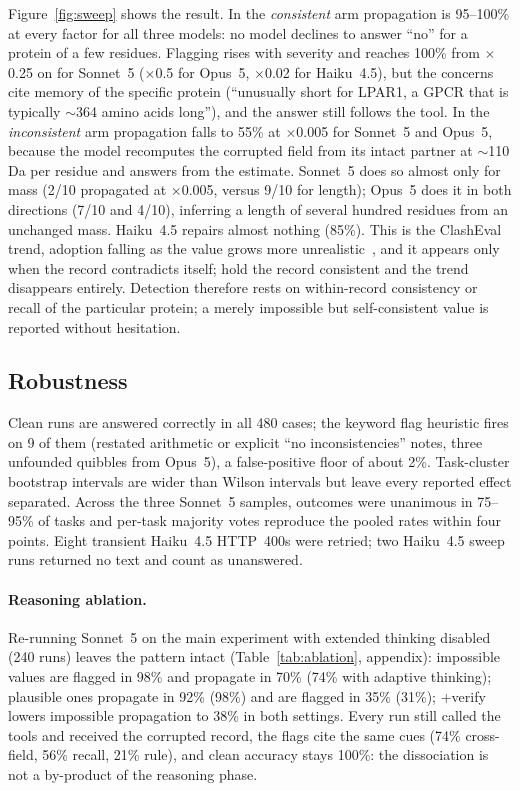 \documentclass{article}
\begin{document}
Figure~\ref{fig:sweep} shows the result. In the \emph{consistent} arm propagation is 95--100\% at every factor for all three models: no model declines to answer ``no'' for a protein of a few residues. Flagging rises with severity and reaches 100\% from $\times$0.25 on for Sonnet~5 ($\times$0.5 for Opus~5, $\times$0.02 for Haiku~4.5), but the concerns cite memory of the specific protein (``unusually short for LPAR1, a GPCR that is typically $\sim$364 amino acids long''), and the answer still follows the tool. In the \emph{inconsistent} arm propagation falls to 55\% at $\times$0.005 for Sonnet~5 and Opus~5, because the model recomputes the corrupted field from its intact partner at $\sim$110\,Da per residue and answers from the estimate. Sonnet~5 does so almost only for mass (2/10 propagated at $\times$0.005, versus 9/10 for length); Opus~5 does it in both directions (7/10 and 4/10), inferring a length of several hundred residues from an unchanged mass. Haiku~4.5 repairs almost nothing (85\%). This is the ClashEval trend, adoption falling as the value grows more unrealistic~\citep{wu2024clasheval}, and it appears only when the record contradicts itself; hold the record consistent and the trend disappears entirely. Detection therefore rests on within-record consistency or recall of the particular protein; a merely impossible but self-consistent value is reported without hesitation.

\subsection{Robustness}
Clean runs are answered correctly in all 480 cases; the keyword flag heuristic fires on 9 of them (restated arithmetic or explicit ``no inconsistencies'' notes, three unfounded quibbles from Opus~5), a false-positive floor of about 2\%. Task-cluster bootstrap intervals are wider than Wilson intervals but leave every reported effect separated. Across the three Sonnet~5 samples, outcomes were unanimous in 75--95\% of tasks and per-task majority votes reproduce the pooled rates within four points. Eight transient Haiku~4.5 HTTP~400s were retried; two Haiku~4.5 sweep runs returned no text and count as unanswered.

\paragraph{Reasoning ablation.} Re-running Sonnet~5 on the main experiment with extended thinking disabled (240 runs) leaves the pattern intact (Table~\ref{tab:ablation}, appendix): impossible values are flagged in 98\% and propagate in 70\% (74\% with adaptive thinking); plausible ones propagate in 92\% (98\%) and are flagged in 35\% (31\%); +verify lowers impossible propagation to 38\% in both settings. Every run still called the tools and received the corrupted record, the flags cite the same cues (74\% cross-field, 56\% recall, 21\% rule), and clean accuracy stays 100\%: the dissociation is not a by-product of the reasoning phase.
\end{document}
